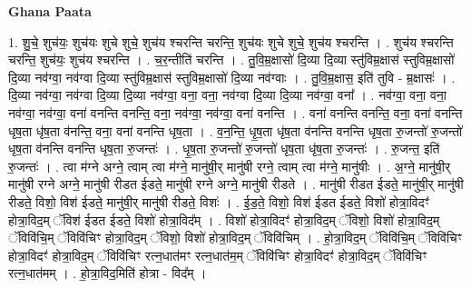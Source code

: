 \documentclass[17pt]{extarticle}
\begin{document}
\textbf{Ghana Paata } \newline

1. शु॒चे॒ शुच॑यः॒ शुच॑यः शुचे शुचे॒ शुच॑य श्चरन्ति चरन्ति॒ शुच॑यः शुचे शुचे॒ शुच॑य श्चरन्ति । . शुच॑य श्चरन्ति चरन्ति॒ शुच॑यः॒ शुच॑य श्चरन्ति । . च॒र॒न्तीति॑ चरन्ति । . तु॒वि॒म्र॒क्षासो॑ दि॒व्या दि॒व्या स्तु॑विम्र॒क्षास॑ स्तुविम्र॒क्षासो॑ दि॒व्या नव॑ग्वा॒ नव॑ग्वा दि॒व्या स्तु॑विम्र॒क्षास॑ स्तुविम्र॒क्षासो॑ दि॒व्या नव॑ग्वाः । . तु॒वि॒म्र॒क्षास॒ इति॑ तुवि - म्र॒क्षासः॑ । . दि॒व्या नव॑ग्वा॒ नव॑ग्वा दि॒व्या दि॒व्या नव॑ग्वा॒ वना॒ वना॒ नव॑ग्वा दि॒व्या दि॒व्या नव॑ग्वा॒ वना᳚ । . नव॑ग्वा॒ वना॒ वना॒ नव॑ग्वा॒ नव॑ग्वा॒ वना॑ वनन्ति वनन्ति॒ वना॒ नव॑ग्वा॒ नव॑ग्वा॒ वना॑ वनन्ति । . वना॑ वनन्ति वनन्ति॒ वना॒ वना॑ वनन्ति धृष॒ता धृ॑ष॒ता व॑नन्ति॒ वना॒ वना॑ वनन्ति धृष॒ता । . व॒न॒न्ति॒ धृ॒ष॒ता धृ॑ष॒ता व॑नन्ति वनन्ति धृष॒ता रु॒जन्तो॑ रु॒जन्तो॑ धृष॒ता व॑नन्ति वनन्ति धृष॒ता रु॒जन्तः॑ । . धृ॒ष॒ता रु॒जन्तो॑ रु॒जन्तो॑ धृष॒ता धृ॑ष॒ता रु॒जन्तः॑ । . रु॒जन्त॒ इति॑ रु॒जन्तः॑ । . त्वा म॑ग्ने अग्ने॒ त्वाम् त्वा म॑ग्ने॒ मानु॑षी॒र् मानु॑षी रग्ने॒ त्वाम् त्वा म॑ग्ने॒ मानु॑षीः । . अ॒ग्ने॒ मानु॑षी॒र् मानु॑षी रग्ने अग्ने॒ मानु॑षी रीडत ईडते॒ मानु॑षी रग्ने अग्ने॒ मानु॑षी रीडते । . मानु॑षी रीडत ईडते॒ मानु॑षी॒र् मानु॑षी रीडते॒ विशो॒ विश॑ ईडते॒ मानु॑षी॒र् मानु॑षी रीडते॒ विशः॑ । . ई॒ड॒ते॒ विशो॒ विश॑ ईडत ईडते॒ विशो॑ होत्रा॒विदꣳ॑ होत्रा॒विद॒म् ॅविश॑ ईडत ईडते॒ विशो॑ होत्रा॒विद᳚म् । . विशो॑ होत्रा॒विदꣳ॑ होत्रा॒विद॒म् ॅविशो॒ विशो॑ होत्रा॒विद॒म् ॅविवि॑चि॒म् ॅविवि॑चिꣳ होत्रा॒विद॒म् ॅविशो॒ विशो॑ होत्रा॒विद॒म् ॅविवि॑चिम् । . हो॒त्रा॒विद॒म् ॅविवि॑चि॒म् ॅविवि॑चिꣳ होत्रा॒विदꣳ॑ होत्रा॒विद॒म् ॅविवि॑चिꣳ रत्न॒धात॑मꣳ रत्न॒धात॑म॒म् ॅविवि॑चिꣳ होत्रा॒विदꣳ॑ होत्रा॒विद॒म् ॅविवि॑चिꣳ रत्न॒धात॑मम् । . हो॒त्रा॒विद॒मिति॑ होत्रा - विद᳚म् । \newline
\end{document}
